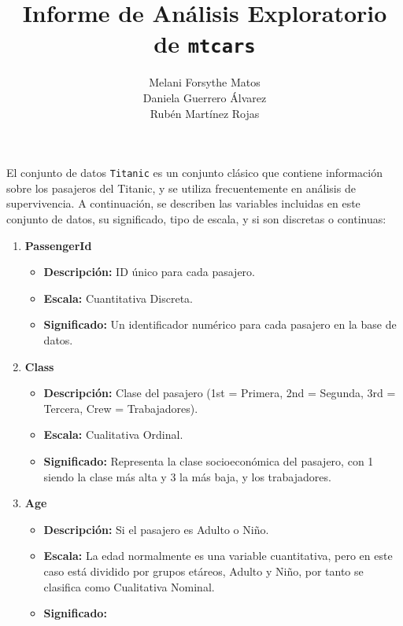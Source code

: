 \documentclass{article}
\title{Informe de Análisis Exploratorio de \texttt{mtcars}}
\author{
  Melani Forsythe Matos \\
  Daniela Guerrero Álvarez \\
  Rubén Martínez Rojas
}
\date{} %
\begin{document}
\maketitle
\newpage %

El conjunto de datos \texttt{Titanic} es un conjunto clásico que contiene información sobre los pasajeros del Titanic, y se utiliza frecuentemente en análisis de supervivencia. A continuación, se describen las variables incluidas en este conjunto de datos, su significado, tipo de escala, y si son discretas o continuas:

\begin{enumerate}
    \item \textbf{PassengerId}
    
    \begin{itemize}
        \item \textbf{Descripción:} ID único para cada pasajero.
        \item \textbf{Escala:} Cuantitativa Discreta.
        \item \textbf{Significado:} Un identificador numérico para cada pasajero en la base de datos.
    \end{itemize}
    \item \textbf{Class}

    \begin{itemize}
        \item \textbf{Descripción:} Clase del pasajero (1st = Primera, 2nd = Segunda, 3rd = Tercera, Crew = Trabajadores).
        \item \textbf{Escala:} Cualitativa Ordinal.
        \item \textbf{Significado:} Representa la clase socioeconómica del pasajero, con 1 siendo la clase más alta y 3 la más baja, y los trabajadores.
    \end{itemize}

    \item \textbf{Age}
    
    \begin{itemize}
        \item \textbf{Descripción:} Si el pasajero es Adulto o Niño.
        \item \textbf{Escala:} La edad normalmente es una variable cuantitativa, pero en este caso está dividido por grupos etáreos, Adulto y Niño, por tanto se clasifica como Cualitativa Nominal.
        \item \textbf{Significado:} 
    \end{itemize}


\end{enumerate}
\end{document}
